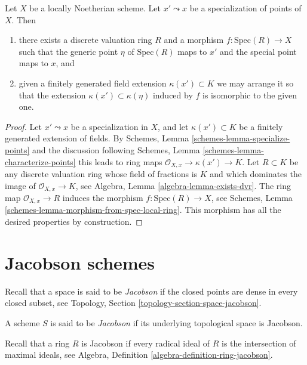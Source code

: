 \begin{lemma}
\label{lemma-locally-Noetherian-specialization-dvr}
Let $X$ be a locally Noetherian scheme.
Let $x' \leadsto x$ be a specialization of points of $X$.
Then
\begin{enumerate}
\item there exists a discrete valuation ring $R$ and a morphism
$f : \text{Spec}(R) \to X$ such that the generic point $\eta$ of
$\text{Spec}(R)$ maps to $x'$ and the special point maps to $x$, and
\item given a finitely generated field extension $\kappa(x') \subset K$ 
we may arrange it so that the extension $\kappa(x') \subset \kappa(\eta)$
induced by $f$ is isomorphic to the given one.
\end{enumerate}
\end{lemma}

\begin{proof}
Let $x' \leadsto x$ be a specialization in $X$, and let
$\kappa(x') \subset K$ be a finitely generated extension of fields. By
Schemes, Lemma \ref{schemes-lemma-specialize-points}
and the discussion following
Schemes, Lemma \ref{schemes-lemma-characterize-points}
this leads to ring maps $\mathcal{O}_{X, x} \to \kappa(x') \to K$.
Let $R \subset K$ be any discrete valuation ring whose field of fractions is
$K$ and which dominates the image of $\mathcal{O}_{X, x} \to K$, see
Algebra, Lemma \ref{algebra-lemma-exists-dvr}.
The ring map $\mathcal{O}_{X, x} \to R$ induces the morphism
$f : \text{Spec}(R) \to X$, see
Schemes, Lemma \ref{schemes-lemma-morphism-from-spec-local-ring}.
This morphism has all the desired properties by construction.
\end{proof}




\section{Jacobson schemes}
\label{section-jacobson}

\noindent
Recall that a space is said to be {\it Jacobson} if the closed points are
dense in every closed subset, see
Topology, Section \ref{topology-section-space-jacobson}.

\begin{definition}
\label{definition-jacobson}
A scheme $S$ is said to be {\it Jacobson} if its underlying topological
space is Jacobson.
\end{definition}

\noindent
Recall that a ring $R$ is Jacobson if every radical ideal of $R$
is the intersection of maximal ideals, see
Algebra, Definition \ref{algebra-definition-ring-jacobson}.

